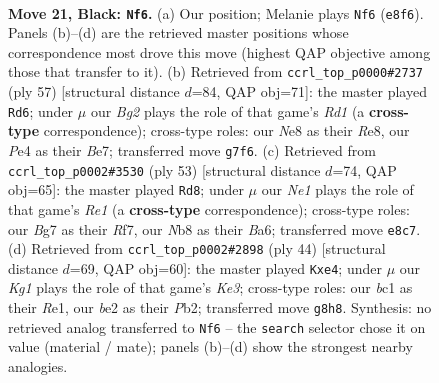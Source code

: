 \documentclass[11pt]{article}
\begin{document}
\begin{figure}[p]
\label{fig:thought-m39}
\end{figure}

\clearpage

\begin{figure}[p]\centering
\begin{subfigure}{0.46\textwidth}\centering
\resizebox{\linewidth}{!}{%
\newchessgame
\chessboard[
  setfen={rnr1n1k1/p4pbp/Pp6/1P1PN2R/4p3/8/4BPP1/R1B1K3 b Q - 1 21},
  showmover=false,
  pgfstyle=straightmove, color=movearrow, markmove={e8-f6}
]}
\caption{}
\end{subfigure}\hfill
\begin{subfigure}{0.46\textwidth}\centering
\resizebox{\linewidth}{!}{%
\newchessgame
\chessboard[
  setfen={3rr1k1/1p2b1p1/p3p2p/P4p1P/2PBn3/5N2/1PK1RPP1/3R4 b - - 0 29},
  showmover=false,
  pgfstyle=straightmove, color=movearrow, markmove={d8-d6}
]}
\caption{}
\end{subfigure}
\\[4pt]
\begin{subfigure}{0.46\textwidth}\centering
\resizebox{\linewidth}{!}{%
\newchessgame
\chessboard[
  setfen={4r1k1/p4rpp/b2pn1n1/P1p2N2/2P1P3/5P2/4B2P/1RB1K2R b - - 1 27},
  showmover=false,
  pgfstyle=straightmove, color=movearrow, markmove={e8-d8}
]}
\caption{}
\end{subfigure}\hfill
\begin{subfigure}{0.46\textwidth}\centering
\resizebox{\linewidth}{!}{%
\newchessgame
\chessboard[
  setfen={r3k3/3rbpp1/p3p2p/4P3/1p1NnP2/4K1P1/PP5P/3RR3 w - - 0 23},
  showmover=false,
  pgfstyle=straightmove, color=movearrow, markmove={e3-e4}
]}
\caption{}
\end{subfigure}
\caption{\textbf{Move 21, Black: \texttt{Nf6}.} (a) Our position; Melanie plays \texttt{Nf6} (\texttt{e8f6}). Panels (b)--(d) are the retrieved master positions whose correspondence most drove this move (highest QAP objective among those that transfer to it). (b) Retrieved from \texttt{ccrl\_top\_p0000\#2737} (ply 57) [structural distance $d$=84, QAP obj=71]: the master played \texttt{Rd6}; under $\mu$ our \emph{Bg2} plays the role of that game's \emph{Rd1} (a \textbf{cross-type} correspondence); cross-type roles: our \emph{N}e8 as their \emph{R}e8, our \emph{P}e4 as their \emph{B}e7; transferred move \texttt{g7f6}. (c) Retrieved from \texttt{ccrl\_top\_p0002\#3530} (ply 53) [structural distance $d$=74, QAP obj=65]: the master played \texttt{Rd8}; under $\mu$ our \emph{Ne1} plays the role of that game's \emph{Re1} (a \textbf{cross-type} correspondence); cross-type roles: our \emph{B}g7 as their \emph{R}f7, our \emph{N}b8 as their \emph{B}a6; transferred move \texttt{e8c7}. (d) Retrieved from \texttt{ccrl\_top\_p0002\#2898} (ply 44) [structural distance $d$=69, QAP obj=60]: the master played \texttt{Kxe4}; under $\mu$ our \emph{Kg1} plays the role of that game's \emph{Ke3}; cross-type roles: our \emph{b}c1 as their \emph{R}e1, our \emph{b}e2 as their \emph{P}b2; transferred move \texttt{g8h8}. Synthesis: no retrieved analog transferred to \texttt{Nf6} -- the \texttt{search} selector chose it on value (material / mate); panels (b)--(d) show the strongest nearby analogies.}
\label{fig:thought-m41}
\end{figure}
\end{document}

